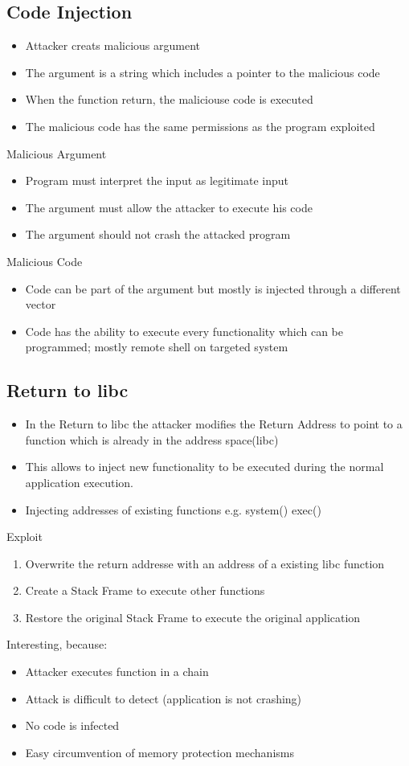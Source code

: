 \documentclass[a4paper, 12pt]{article}
\begin{document}
\subsection{Code Injection}
\begin{itemize}
\item Attacker creats malicious argument
\item The argument is a string which includes a pointer to the malicious code
\item When the function return, the maliciouse code is executed
\item The malicious code has the same permissions as the program exploited
\end{itemize}
\large Malicious Argument
\begin{itemize}
\item Program must interpret the input as legitimate input
\item The argument must allow the attacker to execute his code
\item The argument should not crash the attacked program
\end{itemize}
\large Malicious Code
\begin{itemize}
\item Code can be part of the argument but mostly is injected through a different vector
\item Code has the ability to execute every functionality which can be programmed; mostly remote shell on targeted system
\end{itemize}

\subsection{Return to libc}
\begin{itemize}
\item In the Return to libc the attacker modifies the Return Address to point to a function which is already in the address space(libc)
\item This allows to inject new functionality to be executed during the normal application execution.
\item Injecting addresses of existing functions e.g. system() exec()
\end{itemize}
Exploit
\begin{enumerate}
\item Overwrite the return addresse with an address of a existing libc function
\item Create a Stack Frame to execute other functions
\item Restore the original Stack Frame to execute the original application
\end{enumerate}
Interesting, because:
\begin{itemize}
\item Attacker executes function in a chain
\item Attack is difficult to detect (application is not crashing)
\item No code is infected
\item Easy circumvention of memory protection mechanisms
\end{itemize}
\end{document}
